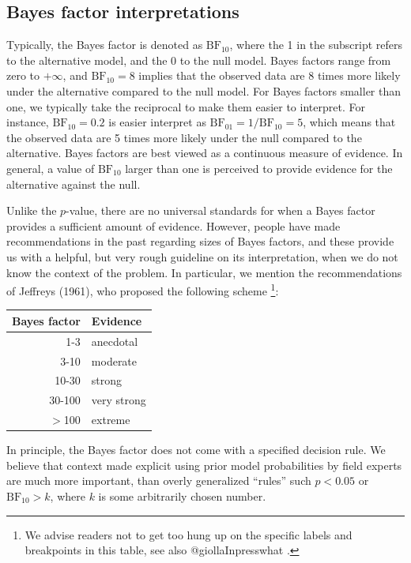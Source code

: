 \documentclass[english,,doc,floatsintext]{apa6}
\begin{document}
\hypertarget{bayes-factor-interpretations}{%
\subsection{Bayes factor interpretations}\label{bayes-factor-interpretations}}

Typically, the Bayes factor is denoted as \(\text{BF}_{10}\), where the 1 in the subscript refers to the alternative model, and the 0 to the null model. Bayes factors range from zero to \(+ \infty\), and \(\text{BF}_{10} = 8\) implies that the observed data are 8 times more likely under the alternative compared to the null model. For Bayes factors smaller than one, we typically take the reciprocal to make them easier to interpret. For instance, \(\text{BF}_{10} = 0.2\) is easier interpret as \(\text{BF}_{01} = 1/\text{BF}_{10} = 5\), which means that the observed data are 5 times more likely under the null compared to the alternative. Bayes factors are best viewed as a continuous measure of evidence. In general, a value of \(\text{BF}_{10}\) larger than one is perceived to provide evidence for the alternative against the null.

Unlike the \(p\)-value, there are no universal standards for when a Bayes factor provides a sufficient amount of evidence. However, people have made recommendations in the past regarding sizes of Bayes factors, and these provide us with a helpful, but very rough guideline on its interpretation, when we do not know the context of the problem. In particular, we mention the recommendations of Jeffreys (1961), who proposed the following scheme
\footnote{We advise readers not to get too hung up on the specific labels and breakpoints in this table, see also @giollaInpresswhat .}:

\begin{center}
\begin{tabular}{rl}
Bayes factor & Evidence\\
\hline
1-3 & anecdotal\\
3-10 & moderate\\
10-30 & strong\\
30-100 & very strong\\
\( > \)100 & extreme\\
\end{tabular}
\end{center}

In principle, the Bayes factor does not come with a specified decision rule. We believe that context made explicit using prior model probabilities by field experts are much more important, than overly generalized \enquote{rules} such \(p < 0.05\) or \(\text{BF} _{10} > k\), where \(k\) is some arbitrarily chosen number.
\end{document}
